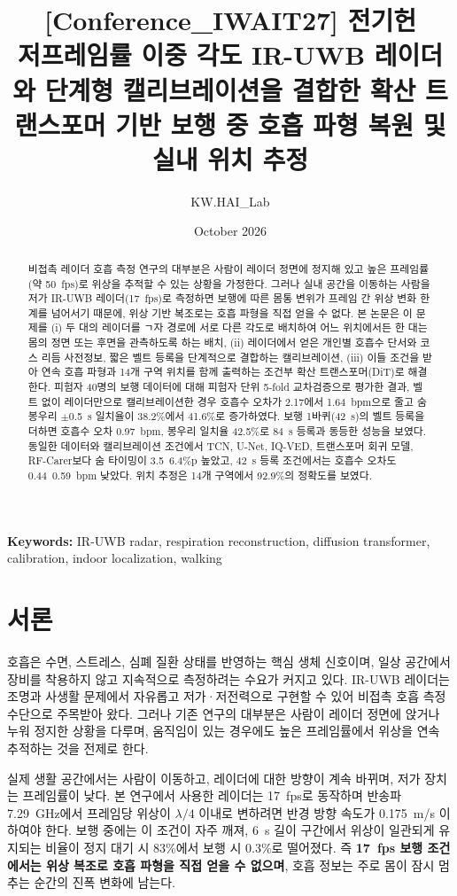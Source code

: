 \documentclass{article}
\title{[Conference\_IWAIT27] 전기헌\\[4pt]
\large 저프레임률 이중 각도 IR-UWB 레이더와 단계형 캘리브레이션을 결합한 확산 트랜스포머 기반 보행 중 호흡 파형 복원 및 실내 위치 추정}
\author{KW.HAI\_Lab}
\date{October 2026}
\begin{document}
\maketitle

\begin{abstract}
비접촉 레이더 호흡 측정 연구의 대부분은 사람이 레이더 정면에 정지해 있고 높은 프레임률(약 50~fps)로 위상을 추적할 수 있는 상황을 가정한다.
그러나 실내 공간을 이동하는 사람을 저가 IR-UWB 레이더(17~fps)로 측정하면 보행에 따른 몸통 변위가 프레임 간 위상 변화 한계를 넘어서기 때문에,
위상 기반 복조로는 호흡 파형을 직접 얻을 수 없다. 본 논문은 이 문제를 (i) 두 대의 레이더를 ㄱ자 경로에 서로 다른 각도로 배치하여 어느 위치에서든 한 대는
몸의 정면 또는 후면을 관측하도록 하는 배치, (ii) 레이더에서 얻은 개인별 호흡수 단서와 코스 리듬 사전정보, 짧은 벨트 등록을 단계적으로 결합하는 캘리브레이션,
(iii) 이들 조건을 받아 연속 호흡 파형과 14개 구역 위치를 함께 출력하는 조건부 확산 트랜스포머(DiT)로 해결한다.
피험자 40명의 보행 데이터에 대해 피험자 단위 5-fold 교차검증으로 평가한 결과, 벨트 없이 레이더만으로 캘리브레이션한 경우 호흡수 오차가 2.17에서 1.64~bpm으로 줄고
숨 봉우리 $\pm$0.5~s 일치율이 38.2\%에서 41.6\%로 증가하였다. 보행 1바퀴(42~s)의 벨트 등록을 더하면 호흡수 오차 0.97~bpm, 봉우리 일치율 42.5\%로 84~s 등록과 동등한 성능을 보였다.
동일한 데이터와 캘리브레이션 조건에서 TCN, U-Net, IQ-VED, 트랜스포머 회귀 모델, RF-Carer보다 숨 타이밍이 3.5~6.4\%p 높았고, 42~s 등록 조건에서는 호흡수 오차도 0.44~0.59~bpm 낮았다.
위치 추정은 14개 구역에서 92.9\%의 정확도를 보였다.
\end{abstract}

\noindent\textbf{Keywords:} IR-UWB radar, respiration reconstruction, diffusion transformer, calibration, indoor localization, walking

\section{서론}
호흡은 수면, 스트레스, 심폐 질환 상태를 반영하는 핵심 생체 신호이며, 일상 공간에서 장비를 착용하지 않고 지속적으로 측정하려는 수요가 커지고 있다.
IR-UWB 레이더는 조명과 사생활 문제에서 자유롭고 저가·저전력으로 구현할 수 있어 비접촉 호흡 측정 수단으로 주목받아 왔다.
그러나 기존 연구의 대부분은 사람이 레이더 정면에 앉거나 누워 정지한 상황을 다루며, 움직임이 있는 경우에도 높은 프레임률에서 위상을 연속 추적하는 것을 전제로 한다.

실제 생활 공간에서는 사람이 이동하고, 레이더에 대한 방향이 계속 바뀌며, 저가 장치는 프레임률이 낮다.
본 연구에서 사용한 레이더는 17~fps로 동작하며 반송파 7.29~GHz에서 프레임당 위상이 $\lambda/4$ 이내로 변하려면 반경 방향 속도가 0.175~m/s 이하여야 한다.
보행 중에는 이 조건이 자주 깨져, 6~s 길이 구간에서 위상이 일관되게 유지되는 비율이 정지 대기 시 83\%에서 보행 시 0.3\%로 떨어졌다.
즉 \textbf{17~fps 보행 조건에서는 위상 복조로 호흡 파형을 직접 얻을 수 없으며}, 호흡 정보는 주로 몸이 잠시 멈추는 순간의 진폭 변화에 남는다.
\end{document}
